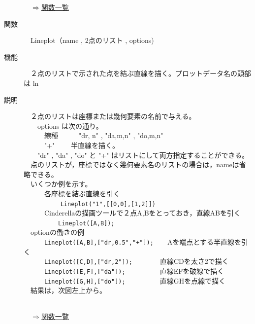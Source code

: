 \documentclass[papersize,a4paper,12pt,uplatex]{jsarticle}
\begin{document}
\begin{description}
\begin{flushright}　\hyperlink{functionlist}{$\Rightarrow$関数一覧}\end{flushright}

\hypertarget{lineplot}{}
\item[関数]　Lineplot（name , 2点のリスト , options)
\item[機能]　２点のリストで示された点を結ぶ直線を描く。プロットデータ名の頭部は ln
\item[説明]　２点のリストは座標または幾何要素の名前で与える。\\
　　options は次の通り。\\
　　　線種　　　"dr, n"  , "da,m,n" , "do,m,n"\\
　　　"+"　　    半直線を描く。\\
　　"dr" , "da" , "do" と "+" はリストにして両方指定することができる。\\
　点のリストが，座標ではなく幾何要素名のリストの場合は，nameは省略できる。\\
　いくつか例を示す。\\
　　　各座標を結ぶ直線を引く\\
　　　　　 \verb|Lineplot("1",[[0,0],[1,2]])|　\\
　　　Cinderellaの描画ツールで２点A,Bをとっておき，直線ABを引く\\
　　　　　\verb|Lineplot([A,B]);| \\
　optionの働きの例\\
　　　\verb|Lineplot([A,B],["dr,0.5","+"]);|　　Aを端点とする半直線を引く\\
　　　\verb|Lineplot([C,D],["dr,2"]);|　　　　直線CDを太さ2で描く\\
　　　\verb|Lineplot([E,F],["da"]);|　　　　　直線EFを破線で描く\\
　　　\verb|Lineplot([G,H],["do"]);|　　　　　直線GHを点線で描く\\
　結果は，次図左上から。\\

　　　　　　\\

\begin{flushright}　\hyperlink{functionlist}{$\Rightarrow$関数一覧}\end{flushright}
\newpage


\end{description}
\end{document}
